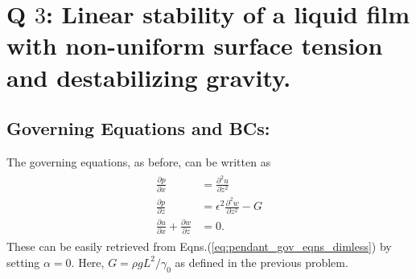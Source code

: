\documentclass{article}
\begin{document}
\section{Q $3$: Linear stability of a liquid film with non-uniform surface tension and destabilizing gravity. }
\subsection*{Governing Equations and BCs:}
The governing equations, as before, can be written as 
\begin{align}\label{eq:marangoni_gov_eqns_dimless}
 \begin{split}
 \frac{\partial p}{\partial x} &= \frac{\partial^{2} u}{\partial z^{2}}  \\
  \frac{\partial p}{\partial z} &= \epsilon^{2} \frac{\partial^{2} w}{\partial z^{2}} - G  \\
  \frac{\partial u}{\partial x} + \frac{\partial w}{\partial z} &= 0.
 \end{split}
\end{align}
These can be easily retrieved from Eqns.(\ref{eq:pendant_gov_eqns_dimless}) by setting $\alpha = 0$. Here, $G = \rho g L^{2}/\gamma_{0}$ as defined in the previous problem. 
\end{document}
